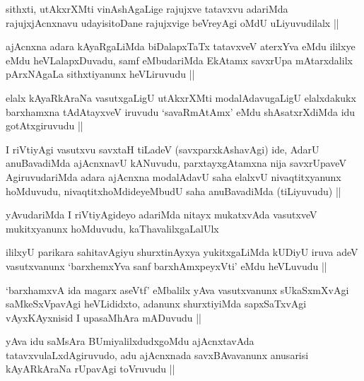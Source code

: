 \begin{artha}
sithxti, utAkxrXMti vinAshAgaLige rajujxve tatavxvu adariMda
rajujxjAcnxnavu udayisitoDane rajujxvige beVreyAgi oMdU uLiyuvudilalx ||
\end{artha}


\begin{artha}
ajAcnxna adara kAyaRgaLiMda biDalapxTaTx tatavxveV aterxYva eMdu
ililxye eMdu heVLalapxDuvadu, samf eMbudariMda EkAtamx savxrUpa
mAtarxdalilx pArxNAgaLa sithxtiyanunx heVLiruvudu ||
\end{artha}

\begin{artha}
elalx kAyaRkAraNa vasutxgaLigU utAkxrXMti modalAdavugaLigU elalxdakukx
barxhamxna tAdAtayxveV iruvudu `savaRmAtAmx' eMdu shAsatxrXdiMda idu
gotAtxgiruvudu ||
\end{artha}

\begin{artha}
I riVtiyAgi vasutxvu savxtaH tiLadeV (savxparxkAshavAgi) ide, AdarU
anuBavadiMda ajAcnxnavU kANuvudu, parxtayxgAtamxna nija savxrUpaveV
AgiruvudariMda adara ajAcnxna modalAdavU saha elalxvU nivaqtitxyanunx
hoMduvudu, nivaqtitxhoMdideyeMbudU saha anuBavadiMda (tiLiyuvudu) ||
\end{artha}

\begin{artha}
yAvudariMda I riVtiyAgideyo adariMda nitayx mukatxvAda vasutxveV
mukitxyanunx hoMduvudu, kaThavalilxgaLalUlx 
\end{artha}

\begin{artha}
ililxyU parikara sahitavAgiyu shurxtinAyxya yukitxgaLiMda kUDiyU iruva
adeV vasutxvanunx `barxhemxYva sanf barxhAmxpeyxVti' eMdu heVLuvudu ||
\end{artha}

\begin{artha}
`barxhamxvA ida magarx aseVtf' eMbalilx yAva vasutxvanunx sUkaSxmXvAgi
  saMkeSxVpavAgi heVLididxto, adanunx shurxtiyiMda sapxSaTxvAgi
  vAyxKAyxnisid I upasaMhAra mADuvudu ||
\end{artha}


\begin{artha}
yAva idu saMsAra BUmiyalilxdudxgoMdu ajAcnxtavAda
tatavxvulaLxdAgiruvudo, adu ajAcnxnada savxBAvavanunx anusarisi
kAyARkAraNa rUpavAgi toVruvudu ||
\end{artha}

